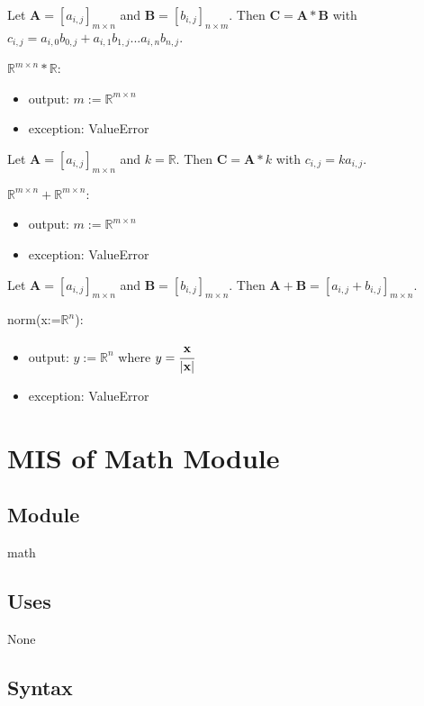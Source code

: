 \documentclass[12pt, titlepage]{article}
\begin{document}
Let $\mathbf{A} = [a_{i,j}]_{m\times n}$ and $\mathbf{B} = [b_{i,j}]_{n\times m}$. Then $\mathbf{C}
= \mathbf{A} * \mathbf{B}$ with $c_{i,j} = a_{i,0} b_{0,j} + a_{i,1} b_{1,j} ...  a_{i,n}b_{n,j}$.
\newline

\noindent $\mathbb{R}^{m \times n} * \mathbb{R}$:
\begin{itemize}
\item output: $m:=\mathbb{R}^{m \times n}$
\item exception: ValueError
\end{itemize}

Let $\mathbf{A} = [a_{i,j}]_{m\times n}$ and $k = \mathbb{R}$. Then $\mathbf{C} = \mathbf{A} * k$
with $c_{i,j} = k a_{i,j}$.
\newline

\noindent $\mathbb{R}^{m \times n} + \mathbb{R}^{m \times n}$:
\begin{itemize}
\item output: $m:=\mathbb{R}^{m \times n}$
\item exception: ValueError
\end{itemize}

Let $\mathbf{A} = [a_{i,j}]_{m \times n}$ and $\mathbf{B} = [b_{i,j}]_{m \times n}$. Then
$\mathbf{A} + \mathbf{B} = [a_{i,j} + b_{i,j}]_{m \times n}$.
\newline

\noindent norm(x:=$\mathbb{R}^{n}$):
\begin{itemize}
\item output: $y:=\mathbb{R}^{n}$ where $y = \cfrac{\mathbf{x}}{|\mathbf{x}|}$
\item exception: ValueError
\end{itemize}

\newpage

\section{MIS of Math Module} \label{mm}

\subsection{Module}
math

\subsection{Uses}
None

\subsection{Syntax}
\end{document}
